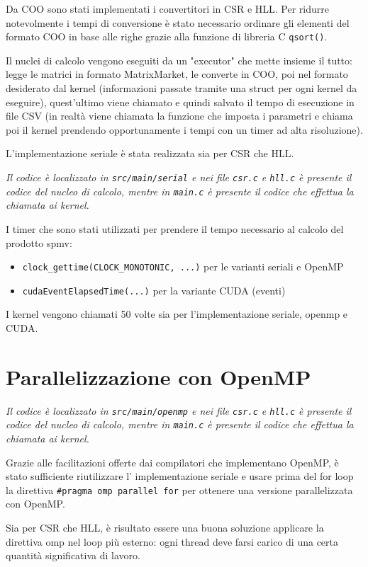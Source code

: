 \documentclass[9pt]{extarticle}
\begin{document}
Da COO sono stati implementati i convertitori in CSR e HLL. Per ridurre notevolmente i tempi di conversione è stato
necessario ordinare gli elementi del formato COO in base alle righe grazie alla funzione di libreria C \texttt{qsort()}.

Il nuclei di calcolo vengono eseguiti da un "executor" che mette insieme il tutto: legge le matrici in formato
MatrixMarket, le converte in COO, poi nel formato desiderato dal kernel (informazioni passate tramite una struct per ogni 
kernel da eseguire), quest'ultimo viene chiamato e quindi salvato il tempo di esecuzione in file CSV (in realtà viene
chiamata la funzione che imposta i parametri e chiama poi il kernel prendendo opportunamente i tempi con un 
timer ad alta risoluzione).

L'implementazione seriale è stata realizzata sia per CSR che HLL.

\textit{Il codice è localizzato in \texttt{src/main/serial} e nei file \texttt{csr.c} e \texttt{hll.c} è presente il 
codice del nucleo di calcolo, mentre in \texttt{main.c} è presente il codice che effettua la chiamata ai kernel.}

I timer che sono stati utilizzati per prendere il tempo necessario al calcolo del prodotto spmv:
\begin{itemize}
	\item \texttt{clock\_gettime(CLOCK\_MONOTONIC, ...)} per le varianti seriali e OpenMP
	\item \texttt{cudaEventElapsedTime(...)} per la variante CUDA (eventi)
\end{itemize}

I kernel vengono chiamati 50 volte sia per l'implementazione seriale, openmp e CUDA.

\section{Parallelizzazione con OpenMP}
\textit{Il codice è localizzato in \texttt{src/main/openmp} e nei file \texttt{csr.c} e \texttt{hll.c} è presente il 
codice del nucleo di calcolo, mentre in \texttt{main.c} è presente il codice che effettua la chiamata ai kernel.}

Grazie alle facilitazioni offerte dai compilatori che implementano OpenMP, è stato sufficiente riutilizzare l'
implementazione seriale e usare prima del for loop la direttiva \texttt{\#pragma omp parallel for} per ottenere
una versione parallelizzata con OpenMP.

Sia per CSR che HLL, è risultato essere una buona soluzione applicare la direttiva omp nel loop più esterno: 
ogni thread deve farsi carico di una certa quantità significativa di lavoro.
\end{document}
